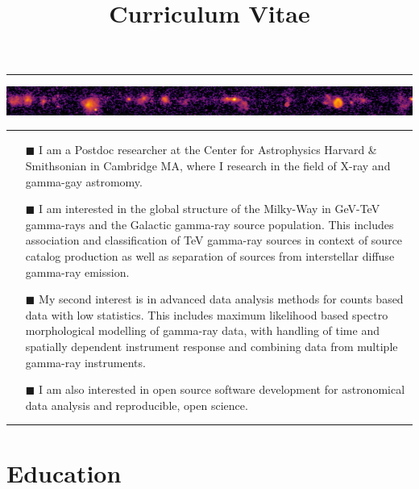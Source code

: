 \documentclass[11pt,a4paper,sans]{moderncv}        %
\title{Curriculum Vitae}                               %
\begin{document}
\makecvtitle

\centering\textcolor{color1}{\rule{\textwidth}{1pt}}
\vspace*{-11pt}\includegraphics[width=\textwidth]{galactic-plane}
\centering\textcolor{color1}{\rule{\textwidth}{1pt}}

\begin{multicols}{2}
\begin{itemize}
\item[\small\textcolor{color1}{$\blacksquare$}] I am a Postdoc researcher at the Center for Astrophysics Harvard \& Smithsonian in Cambridge MA, where I research in the field of X-ray and gamma-gay astromomy.
\item[\small\textcolor{color1}{$\blacksquare$}] I am interested in the global structure of the Milky-Way in GeV-TeV gamma-rays and the Galactic gamma-ray source population. This includes association and classification of TeV gamma-ray sources in context of source catalog production as well as separation of sources from interstellar diffuse gamma-ray emission.   
\item[\small\textcolor{color1}{$\blacksquare$}] My second interest is in advanced data analysis methods for counts based data with low statistics. This includes maximum likelihood based spectro morphological modelling of gamma-ray data, with handling of time and spatially dependent instrument response and combining data from multiple gamma-ray instruments. 
\item[\small\textcolor{color1}{$\blacksquare$}] I am also interested in open source software development for astronomical data analysis and reproducible, open science.
\end{itemize}
\end{multicols}

\centering\textcolor{color1}{\rule{\textwidth}{1pt}}

\section{\textbf{Education}}
\end{document}
